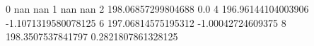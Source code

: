 0 nan nan
1 nan nan
2 198.06857299804688 0.0
4 196.96144104003906 -1.1071319580078125
6 197.06814575195312 -1.00042724609375
8 198.3507537841797 0.2821807861328125
